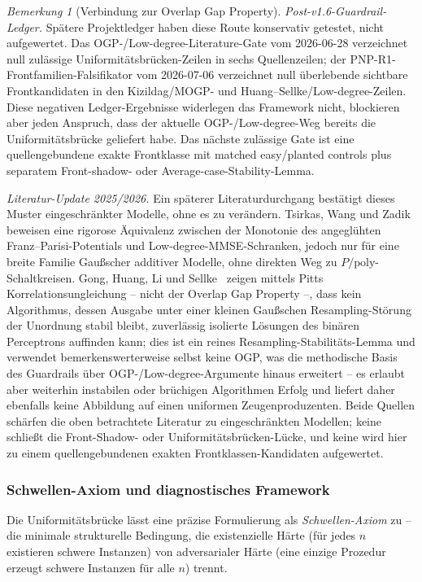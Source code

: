 \documentclass[aps,prd,twocolumn,superscriptaddress,nofootinbib]{revtex4-2}
\theoremstyle{definition}
\theoremstyle{remark}
\newtheorem{remark}[theorem]{Bemerkung}
\begin{document}
\begin{remark}[Verbindung zur Overlap Gap Property]
\medskip\noindent\emph{Post-v1.6-Guardrail-Ledger.}
Spätere Projektledger haben diese Route konservativ getestet, nicht aufgewertet. Das OGP-/Low-degree-Literature-Gate vom 2026-06-28 verzeichnet null zulässige Uniformitätsbrücken-Zeilen in sechs Quellenzeilen; der PNP-R1-Frontfamilien-Falsifikator vom 2026-07-06 verzeichnet null überlebende sichtbare Frontkandidaten in den Kizildag/MOGP- und Huang--Sellke/Low-degree-Zeilen. Diese negativen Ledger-Ergebnisse widerlegen das Framework nicht, blockieren aber jeden Anspruch, dass der aktuelle OGP-/Low-degree-Weg bereits die Uniformitätsbrücke geliefert habe. Das nächste zulässige Gate ist eine quellengebundene exakte Frontklasse mit matched easy/planted controls plus separatem Front-shadow- oder Average-case-Stability-Lemma.

\medskip\noindent\emph{Literatur-Update 2025/2026.}
Ein späterer Literaturdurchgang bestätigt dieses Muster eingeschränkter Modelle, ohne es zu verändern. Tsirkas, Wang und Zadik~\cite{TsirkasWangZadik2026} beweisen eine rigorose Äquivalenz zwischen der Monotonie des angeglühten Franz--Parisi-Potentials und Low-degree-MMSE-Schranken, jedoch nur für eine breite Familie Gaußscher additiver Modelle, ohne direkten Weg zu $P/\mathrm{poly}$-Schaltkreisen. Gong, Huang, Li und Sellke~\cite{GongHuangLiSellke2026} zeigen mittels Pitts Korrelationsungleichung -- nicht der Overlap Gap Property --, dass kein Algorithmus, dessen Ausgabe unter einer kleinen Gaußschen Resampling-Störung der Unordnung stabil bleibt, zuverlässig isolierte Lösungen des binären Perceptrons auffinden kann; dies ist ein reines Resampling-Stabilitäts-Lemma und verwendet bemerkenswerterweise selbst keine OGP, was die methodische Basis des Guardrails über OGP-/Low-degree-Argumente hinaus erweitert -- es erlaubt aber weiterhin instabilen oder brüchigen Algorithmen Erfolg und liefert daher ebenfalls keine Abbildung auf einen uniformen Zeugenproduzenten. Beide Quellen schärfen die oben betrachtete Literatur zu eingeschränkten Modellen; keine schließt die Front-Shadow- oder Uniformitätsbrücken-Lücke, und keine wird hier zu einem quellengebundenen exakten Frontklassen-Kandidaten aufgewertet.
\end{remark}

\subsubsection*{Schwellen-Axiom und diagnostisches Framework}

Die Uniformitätsbrücke lässt eine präzise Formulierung als \emph{Schwellen-Axiom} zu -- die minimale strukturelle Bedingung, die existenzielle Härte (\glqq für jedes $n$ existieren schwere Instanzen\grqq{}) von adversarialer Härte (\glqq eine einzige Prozedur erzeugt schwere Instanzen für alle $n$\grqq{}) trennt.
\end{document}
